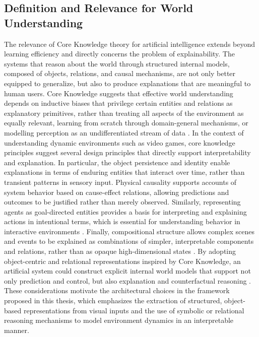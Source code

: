 \documentclass[12pt,a4paper]{report}
\begin{document}
\subsection{Definition and Relevance for World Understanding}
The relevance of Core Knowledge theory for artificial intelligence extends beyond learning efficiency and directly concerns the problem of explainability. The systems that reason about the world through structured internal models, composed of objects, relations, and causal mechanisms, are not only better equipped to generalize, but also to produce explanations that are meaningful to human users. Core Knowledge suggests that effective world understanding depends on inductive biases that privilege certain entities and relations as explanatory primitives, rather than treating all aspects of the environment as equally relevant, learning from scratch through domain-general mechanisms, or modelling perception as an undifferentiated stream of data \cite{chiave10}.
In the context of understanding dynamic environments such as video games, core knowledge principles suggest several design principles that directly support interpretability and explanation. In particular, the object persistence and identity enable explanations in terms of enduring entities that interact over time, rather than transient patterns in sensory input. Physical causality supports accounts of system behavior based on cause-effect relations, allowing predictions and outcomes to be justified rather than merely observed. Similarly, representing agents as goal-directed entities provides a basis for interpreting and explaining actions in intentional terms, which is essential for understanding behavior in interactive environments \cite{chiave10}. Finally, compositional structure allows complex scenes and events to be explained as combinations of simpler, interpretable components and relations, rather than as opaque high-dimensional states \cite{chiave8}.
By adopting object-centric and relational representations inspired by Core Knowledge, an artificial system could construct explicit internal world models that support not only prediction and control, but also explanation and counterfactual reasoning \cite{chiave18}. These considerations motivate the architectural choices in the framework proposed in this thesis, which emphasizes the extraction of structured, object-based representations from visual inputs and the use of symbolic or relational reasoning mechanisms to model environment dynamics in an interpretable manner.
\end{document}
